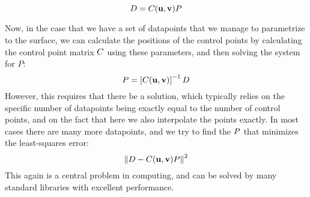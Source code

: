 \begin{equation}
\lsDataPointMatrix = \lsControlPointCoefMatrix(\vec{u},\vec{v})\lsControlPointMatrix
\label{eqn:lsmatrix2}
\end{equation}

Now, in the case that we have a set of datapoints that we manage to parametrize to the surface, we can calculate the positions of the control points by calculating the control point matrix $\lsControlPointCoefMatrix$ using these parameters, and then solving the system for $P$:
\begin{equation*}
\lsControlPointMatrix = \left[\lsControlPointCoefMatrix(\vec{u},\vec{v})\right]^{-1}\lsDataPointMatrix
\end{equation*}
However, this requires that there be a solution, which typically relies on the specific number of datapoints being exactly equal to the number of control points, and on the fact that here we also interpolate the points exactly. In most cases there are many more datapoints, and we try to find the $\lsControlPointMatrix$ that minimizes the least-squares error:
\begin{equation}
\norm{\lsDataPointMatrix - \lsControlPointCoefMatrix(\vec{u},\vec{v})\lsControlPointMatrix}^2
\label{eqn:lsminim}
\end{equation}
This again is a central problem in computing, and can be solved by many standard libraries with excellent performance.


